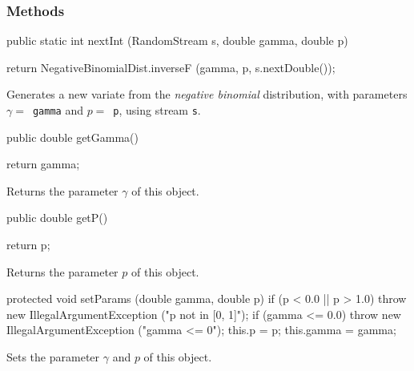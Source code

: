 \subsubsection* {Methods}
\begin{code}
    
   public static int nextInt (RandomStream s, double gamma, double p) \begin{hide} {
      return NegativeBinomialDist.inverseF (gamma, p, s.nextDouble());
   }\end{hide}
\end{code}
\begin{tabb}
 Generates a new variate from the {\em negative binomial\/} distribution,
 with parameters $\gamma = $~\texttt{gamma} and $p = $~\texttt{p},
 using stream \texttt{s}.
\end{tabb}
\begin{code}

   public double getGamma()\begin{hide} {
      return gamma;
   }\end{hide}
\end{code}
\begin{tabb} Returns the parameter $\gamma$ of this object.
\end{tabb}
\begin{code}

   public double getP()\begin{hide} {
      return p;
   }\end{hide}
\end{code}
\begin{tabb} Returns the parameter $p$ of this object.
\end{tabb}
\begin{hide}\begin{code}

   protected void setParams (double gamma, double p) {
      if (p < 0.0 || p > 1.0)
         throw new IllegalArgumentException ("p not in [0, 1]");
      if (gamma <= 0.0)
         throw new IllegalArgumentException ("gamma <= 0");
      this.p = p;
      this.gamma = gamma;
   }
\end{code}
\begin{tabb} Sets the parameter $\gamma$ and $p$ of this object.
\end{tabb}
\begin{code}
}\end{code}
\end{hide}

